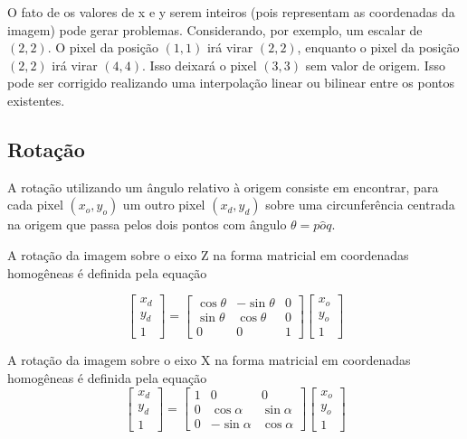 \documentclass[12pt,oneside,a4paper,english,french,spanish,brazil,]{abntex2}
\begin{document}
O fato de os valores de x e y serem inteiros (pois representam as coordenadas da imagem) pode gerar problemas. Considerando, por exemplo, um escalar de \((2,2)\). O pixel da posição \((1,1)\) irá virar \((2,2)\), enquanto o pixel da posição \((2,2)\) irá virar \((4,4)\). Isso deixará o pixel \((3,3)\) sem valor de origem. Isso pode ser corrigido realizando uma interpolação linear ou bilinear entre os pontos existentes.

\subsection{Rotação}

A rotação utilizando um ângulo  relativo à origem consiste em encontrar, para cada pixel \((x_o,y_o)\) um outro pixel \((x_d,y_d)\) sobre uma circunferência centrada na origem que passa pelos dois pontos com ângulo \(\theta=p \hat{o} q\). 

A rotação da imagem sobre o eixo Z na forma matricial em coordenadas homogêneas é definida pela equação

\[
\begin{bmatrix}
x_d\\ 
y_d\\ 
1
\end{bmatrix}
=
\begin{bmatrix}
\cos{\theta} & -\sin{\theta} & 0\\ 
\sin{\theta} & \cos{\theta} & 0\\ 
0 & 0 & 1
\end{bmatrix}
\begin{bmatrix}
x_o\\ 
y_o\\ 
1
\end{bmatrix}
\]

A rotação da imagem sobre o eixo X na forma matricial em coordenadas homogêneas é definida pela equação
\[
\begin{bmatrix}
x_d\\ 
y_d\\ 
1
\end{bmatrix}
=
\begin{bmatrix}
1 & 0 & 0\\ 
0 & \cos{\alpha } & \sin{\alpha }\\ 
0 & -\sin{\alpha } & \cos{\alpha }
\end{bmatrix}
\begin{bmatrix}
x_o\\ 
y_o\\ 
1
\end{bmatrix}
\]
\end{document}
